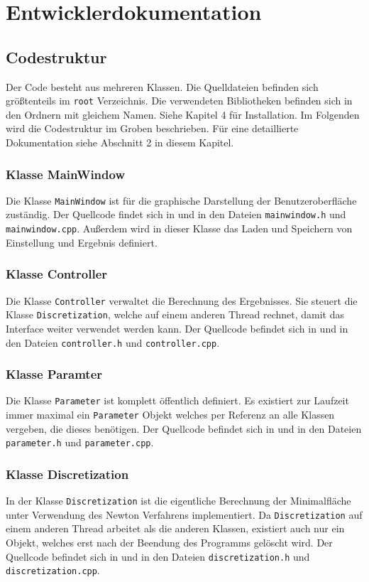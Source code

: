 \chapter{Entwicklerdokumentation}
\label{ch:5}

\section{Codestruktur}
Der Code besteht aus mehreren Klassen. Die Quelldateien befinden sich gr\"o\ss tenteils im {\tt root} Verzeichnis. Die verwendeten Bibliotheken befinden sich in den Ordnern mit gleichem Namen. Siehe Kapitel 4 f\"ur Installation. Im Folgenden wird die Codestruktur im Groben beschrieben. F\"ur eine detaillierte Dokumentation siehe Abschnitt 2 in diesem Kapitel.

\subsection{Klasse MainWindow}
Die Klasse {\tt MainWindow} ist f\"ur die graphische Darstellung der Benutzeroberfl\"ache zust\"andig. Der Quellcode findet sich in  und in den Dateien {\tt mainwindow.h} und {\tt mainwindow.cpp}. Au\ss erdem wird in dieser Klasse das Laden und Speichern von Einstellung und Ergebnis definiert.

\subsection{Klasse Controller}
Die Klasse {\tt Controller} verwaltet die Berechnung des Ergebnisses. Sie steuert die Klasse {\tt Discretization}, welche auf einem anderen Thread rechnet, damit das Interface weiter verwendet werden kann.  Der Quellcode befindet sich in  und in den Dateien {\tt controller.h} und {\tt controller.cpp}.

\subsection{Klasse Paramter}
Die Klasse {\tt Parameter} ist komplett \"offentlich definiert. Es existiert zur Laufzeit immer maximal ein {\tt Parameter} Objekt welches per Referenz an alle Klassen vergeben, die dieses benötigen. Der Quellcode befindet sich in  und in den Dateien {\tt parameter.h} und {\tt parameter.cpp}.

\subsection{Klasse Discretization}
In der Klasse {\tt Discretization} ist die eigentliche Berechnung der Minimalfl\"ache unter Verwendung des Newton Verfahrens implementiert. Da {\tt Discretization} auf einem anderen Thread arbeitet als die anderen Klassen, existiert auch nur ein Objekt, welches erst nach der Beendung des Programms gel\"oscht wird. Der Quellcode befindet sich in  und in den Dateien {\tt discretization.h} und {\tt discretization.cpp}.

